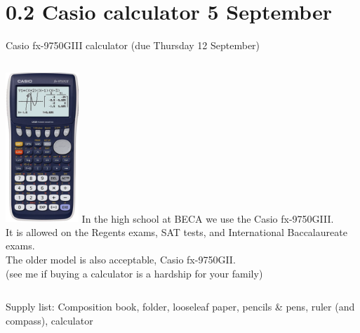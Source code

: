 \documentclass[onlytextwidth]{beamer}
\begin{document}
\section{0.2 Casio calculator \hfill 5 September}
\begin{frame}{Casio fx-9750GIII calculator (due Thursday 12 September)}
  \begin{columns}
      \includegraphics[width=2.75cm]{../graphics/casio_fx-9750GII.png}
      In the high school at BECA we use the Casio fx-9750GIII.\\[5pt] 
      It is allowed on the Regents exams, SAT tests, and International Baccalaureate exams.\\[5pt]
      The older model is also acceptable, Casio fx-9750\alert{GII}.\\[5pt]
      (see me if buying a calculator is a hardship for your family)
    \end{columns} \vspace{1cm}
  Supply list: Composition book, folder, looseleaf paper, pencils \& pens, ruler (and compass), calculator
\end{frame}
\end{document}
